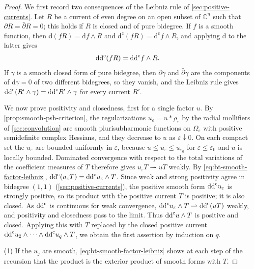 \begin{proof}
We first record two consequences of the Leibniz rule of \cref{sec:positive-currents}. Let $R$ be a current of even degree on an open subset of $\mathbb C^n$ such that $\partial R=\bar\partial R=0$; this holds if $R$ is closed and of pure bidegree. If $f$ is a smooth function, then $\mathrm d(fR)=\mathrm df\wedge R$ and $\mathrm d^{\mathrm c}(fR)=\mathrm d^{\mathrm c}f\wedge R$, and applying $\mathrm d$ to the latter gives
\begin{equation}\label{eq:bt-smooth-factor-leibniz}
 \mathrm{dd}^{\mathrm{c}}(fR)=\mathrm{dd}^{\mathrm{c}} f\wedge R.
\end{equation}
If $\gamma$ is a smooth closed form of pure bidegree, then $\partial\gamma$ and $\bar\partial\gamma$ are the components of $\mathrm d\gamma=0$ of two different bidegrees, so they vanish, and the Leibniz rule gives $\mathrm{dd}^{\mathrm{c}}(R'\wedge\gamma)=\mathrm{dd}^{\mathrm{c}} R'\wedge\gamma$ for every current $R'$.

We now prove positivity and closedness, first for a single factor $u$. By \cref{prop:smooth-psh-criterion}, the regularizations $u_\varepsilon=u*\rho_\varepsilon$ by the radial mollifiers of \cref{sec:convolution} are smooth plurisubharmonic functions on $\Omega_\varepsilon$ with positive semidefinite complex Hessians, and they decrease to $u$ as $\varepsilon\downarrow0$. On each compact set the $u_\varepsilon$ are bounded uniformly in $\varepsilon$, because $u\le u_\varepsilon\le u_{\varepsilon_0}$ for $\varepsilon\le\varepsilon_0$ and $u$ is locally bounded. Dominated convergence with respect to the total variations of the coefficient measures of $T$ therefore gives $u_\varepsilon T\rightharpoonup uT$ weakly. By \eqref{eq:bt-smooth-factor-leibniz}, $\mathrm{dd}^{\mathrm{c}}(u_\varepsilon T)=\mathrm{dd}^{\mathrm{c}} u_\varepsilon\wedge T$. Since weak and strong positivity agree in bidegree $(1,1)$ (\cref{sec:positive-currents}), the positive smooth form $\mathrm{dd}^{\mathrm{c}} u_\varepsilon$ is strongly positive, so its product with the positive current $T$ is positive; it is also closed. As $\mathrm{dd}^{\mathrm{c}}$ is continuous for weak convergence, $\mathrm{dd}^{\mathrm{c}} u_\varepsilon\wedge T\rightharpoonup\mathrm{dd}^{\mathrm{c}}(uT)$ weakly, and positivity and closedness pass to the limit. Thus $\mathrm{dd}^{\mathrm{c}} u\wedge T$ is positive and closed. Applying this with $T$ replaced by the closed positive current $\mathrm{dd}^{\mathrm{c}} u_2\wedge\cdots\wedge\mathrm{dd}^{\mathrm{c}} u_q\wedge T$, we obtain the first assertion by induction on $q$.

(1) If the $u_j$ are smooth, \eqref{eq:bt-smooth-factor-leibniz} shows at each step of the recursion that the product is the exterior product of smooth forms with $T$.


\end{proof}
